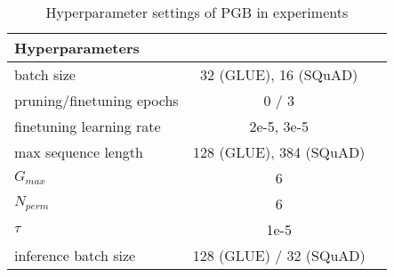 \begin{table*} [htb]
\centering
\caption{Specifications of $\text{BERT}_{\text{BASE}}$, $\text{DistilBERT}_{\text{BASE}}$ and $\text{RoBERTa}_{\text{BASE}}$ models}
\label{tab:BERT}
\end{table*}
\begin{table} []
\begin{tabular}{lcc}
\noalign{\smallskip}\noalign{\smallskip}\hline
Hyperparameters &     \\
\hline
batch size  & 32 (GLUE), 16 (SQuAD) \\
pruning/finetuning epochs&   0 / 3  \\
finetuning learning rate & 2e-5, 3e-5 \\
max sequence length & 128 (GLUE), 384 (SQuAD) \\
$G_{max}$ & 6  \\
$N_{perm}$ & 6 \\
$\tau$       & 1e-5 \\    
inference batch size & 128 (GLUE) / 32 (SQuAD) \\


\hline
\end{tabular}
\centering
\caption{Hyperparameter settings of PGB in experiments}
\label{tab:hyper}
\end{table}

